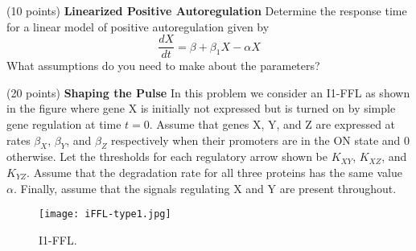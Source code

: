 \documentclass{exam}
\begin{document}
\begin{questions}

\question (10 points)
\textbf{Linearized Positive Autoregulation}
Determine the response time for a linear model of positive autoregulation given by
$$ \frac{dX}{dt} = \beta + \beta_1 X - \alpha X$$
What assumptions do you need to make about the parameters?

\question (20 points)
\textbf{Shaping the Pulse}
In this problem we consider an I1-FFL as shown in the figure where gene X is initially not expressed but is turned on by simple gene regulation at time $t=0$. Assume that genes X, Y, and Z are expressed at rates $\beta_X$, $\beta_Y$, and $\beta_Z$ respectively when their promoters are in the ON state and 0 otherwise. Let the thresholds for each regulatory arrow shown be $K_{XY}$, $K_{XZ}$, and $K_{YZ}$.
Assume that the degradation rate for all three proteins has the same value $\alpha$.
Finally, assume that the signals regulating X and Y are present throughout.
\begin{figure}[h]
\begin{center}
    \texttt{[image: iFFL-type1.jpg]}
\end{center}
\caption{I1-FFL.}
\end{figure}
\end{questions}
\end{document}
